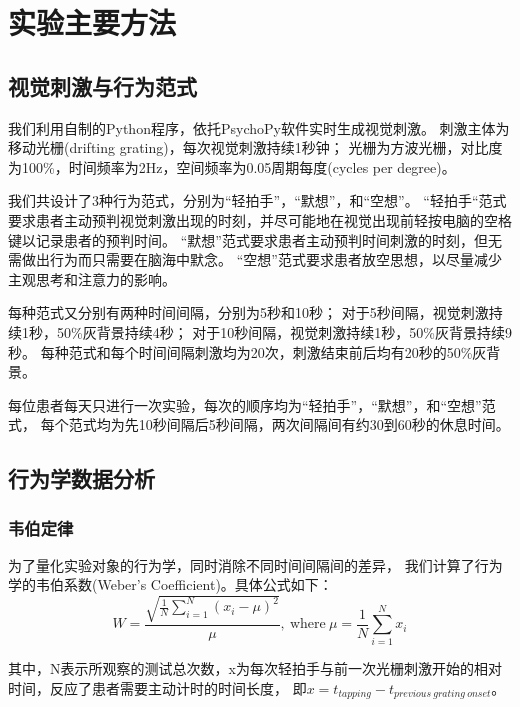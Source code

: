 \section{实验主要方法}

\subsection{视觉刺激与行为范式}

我们利用自制的Python程序，依托PsychoPy软件\cite{psychopy}实时生成视觉刺激。
刺激主体为移动光栅(drifting grating)，每次视觉刺激持续1秒钟；
光栅为方波光栅，对比度为100\%，时间频率为2Hz，空间频率为0.05周期每度(cycles per degree)。

我们共设计了3种行为范式，分别为“轻拍手”，“默想”，和“空想”。%
“轻拍手“范式要求患者主动预判视觉刺激出现的时刻，并尽可能地在视觉出现前轻按电脑的空格键以记录患者的预判时间。
“默想”范式要求患者主动预判时间刺激的时刻，但无需做出行为而只需要在脑海中默念。
“空想”范式要求患者放空思想，以尽量减少主观思考和注意力的影响。

每种范式又分别有两种时间间隔，分别为5秒和10秒；
对于5秒间隔，视觉刺激持续1秒，50\%灰背景持续4秒；
对于10秒间隔，视觉刺激持续1秒，50\%灰背景持续9秒。
每种范式和每个时间间隔刺激均为20次，刺激结束前后均有20秒的50\%灰背景。

每位患者每天只进行一次实验，每次的顺序均为“轻拍手”，“默想”，和“空想”范式，
每个范式均为先10秒间隔后5秒间隔，两次间隔间有约30到60秒的休息时间。

\subsection{行为学数据分析}

\subsubsection{韦伯定律}
为了量化实验对象的行为学，同时消除不同时间间隔间的差异，
我们计算了行为学的韦伯系数(Weber's Coefficient)\cite{gibbon1977scalar, hardy2018encoding}。具体公式如下：
\begin{equation}
    W = \frac{\sqrt{\frac{1}{N} \sum_{i=1}^N (x_i - \mu) ^ 2}}{\mu},\ \mathrm{where}\ \mu = \frac{1}{N} \sum_{i=1}^N x_i
\end{equation}

其中，N表示所观察的测试总次数，x为每次轻拍手与前一次光栅刺激开始的相对时间，反应了患者需要主动计时的时间长度，
即$ x = t_{tapping} - t_{previous\ grating\ onset} $。

